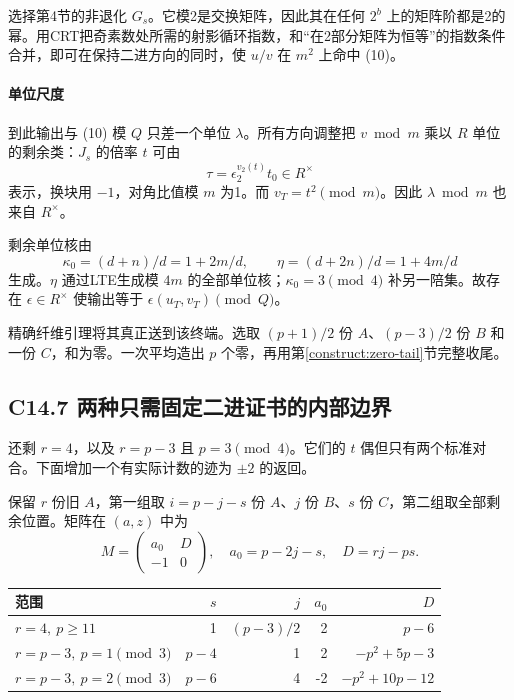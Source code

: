 \documentclass[11pt,a4paper]{article}
\theoremstyle{definition}
\numberwithin{equation}{section}
\begin{document}
{选择第4节的非退化} \(G_s\){。它模2是交换矩阵，因此其在任何} \(2^b\) {上的矩阵阶都是2的幂。用CRT把奇素数处所需的射影循环指数，和``在2部分矩阵为恒等''的指数条件合并，即可在保持二进方向的同时，使} \(u/v\) {在} \(m^2\) {上命中} {(10)。}

\paragraph*{\texorpdfstring{{单位尺度}}{单位尺度}}\label{C14-h101}

{到此输出与} {(10)} {模} \(Q\) {只差一个单位} \(\lambda\){。所有方向调整把} \(v\bmod m\) {乘以} \(R\) {单位的剩余类：}\(J_s\) {的倍率} \(t\) {可由} \[
\tau=\epsilon_2^{v_2(t)}t_0\in R^\times
\] {表示，换块用} \(-1\){，对角比值模} \(m\) {为1。而} \(v_T=t^2\pmod m\){。因此} \(\lambda\bmod m\) {也来自} \(R^\times\){。}

{剩余单位核由} \[
\kappa_0=(d+n)/d=1+2m/d,\qquad
\eta=(d+2n)/d=1+4m/d
\] {生成。}\(\eta\) {通过LTE生成模} \(4m\) {的全部单位核；}\(\kappa_0=3\pmod4\) {补另一陪集。故存在} \(\epsilon\in R^\times\) {使输出等于} \(\epsilon(u_T,v_T)\pmod Q\){。}

{精确纤维引理将其真正送到该终端。选取} \((p+1)/2\) {份} \(A\){、}\((p-3)/2\) {份} \(B\) {和一份} \(C\){，和为零。一次平均造出} \(p\) {个零，再用}第\ref{construct:zero-tail}节{完整收尾。}

\subsection*{\texorpdfstring{{C14.7} {两种只需固定二进证书的内部边界}}{C14.7 两种只需固定二进证书的内部边界}}\label{C14-h102}

{还剩} \(r=4\){，以及} \(r=p-3\) {且} \(p=3\pmod4\){。它们的} \(t\) {偶但只有两个标准对合。下面增加一个有实际计数的迹为} \(\pm2\) {的返回。}

{保留} \(r\) {份旧} \(A\){，第一组取} \(i=p-j-s\) {份} \(A\){、}\(j\) {份} \(B\){、}\(s\) {份} \(C\){，第二组取全部剩余位置。矩阵在} \((a,z)\) {中为} \[
M=\begin{pmatrix}a_0&D\\-1&0\end{pmatrix},\quad
a_0=p-2j-s,\quad D=rj-ps.
\tag{C14.11}
\]

{ %
\begin{longtable}[]{@{}lrrrr@{}}
\toprule\noalign{}
{范围} & \(s\) & \(j\) & \(a_0\) & \(D\) \\
\midrule\noalign{}
\endhead
\bottomrule\noalign{}
\endlastfoot
\(r=4,\ p\ge11\) & {1} & \((p-3)/2\) & {2} & \(p-6\) \\
\(r=p-3,\ p=1\pmod3\) & \(p-4\) & {1} & {2} & \(-p^2+5p-3\) \\
\(r=p-3,\ p=2\pmod3\) & \(p-6\) & {4} & {-2} & \(-p^2+10p-12\) \\
\end{longtable}
}
\end{document}
